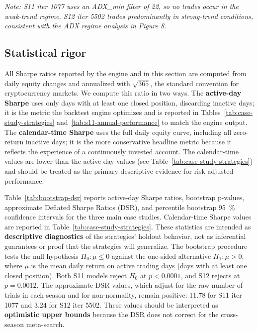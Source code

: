 \documentclass[11pt,a4paper]{article}
\begin{document}
\emph{Note: S11 iter 1077 uses an ADX\_min filter of 22, so no trades occur in the weak-trend regime. S12 iter 5502 trades predominantly in strong-trend conditions, consistent with the ADX regime analysis in Figure 8.}

\subsection{Statistical rigor}\label{statistical-rigor}

All Sharpe ratios reported by the engine and in this section are computed from daily equity changes and annualized with $\sqrt{365}$, the standard convention for cryptocurrency markets. We compute this ratio in two ways. The \textbf{active-day Sharpe} uses only days with at least one closed position, discarding inactive days; it is the metric the backtest engine optimizes and is reported in Tables~\ref{tab:case-study-strategies} and~\ref{tab:s11-annual-performance} to match the engine output. The \textbf{calendar-time Sharpe} uses the full daily equity curve, including all zero-return inactive days; it is the more conservative headline metric because it reflects the experience of a continuously invested account. The calendar-time values are lower than the active-day values (see Table~\ref{tab:case-study-strategies}) and should be treated as the primary descriptive evidence for risk-adjusted performance.

Table~\ref{tab:bootstrap-dsr} reports active-day Sharpe ratios, bootstrap p-values, approximate Deflated Sharpe Ratios (DSR), and percentile bootstrap 95~\% confidence intervals for the three main case studies. Calendar-time Sharpe values are reported in Table~\ref{tab:case-study-strategies}. These statistics are intended as \textbf{descriptive diagnostics} of the strategies' holdout behavior, not as inferential guarantees or proof that the strategies will generalize. The bootstrap procedure tests the null hypothesis \(H_0: \mu \le 0\) against the one-sided alternative \(H_1: \mu > 0\), where \(\mu\) is the mean daily return on active trading days (days with at least one closed position). Both S11 models reject \(H_0\) at \(p < 0.0001\), and S12 rejects at \(p = 0.0012\). The approximate DSR values, which adjust for the raw number of trials in each season and for non-normality, remain positive: 11.78 for S11 iter 1077 and 3.24 for S12 iter 5502. These values should be interpreted as \textbf{optimistic upper bounds} because the DSR does not correct for the cross-season meta-search.
\end{document}
